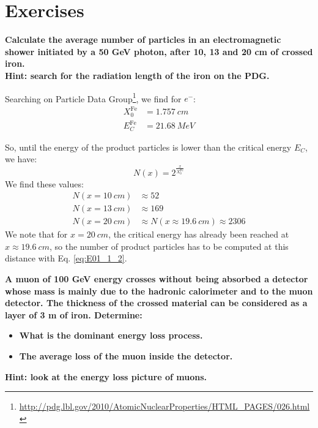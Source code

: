 \documentclass[../../main/main.tex]{subfiles}
\begin{document}
\chapter{Exercises}

\begin{exercise}{}{}
	\textbf{Calculate the average number of particles in an electromagnetic shower initiated by a 50 GeV photon, after 10, 13 and 20 cm of crossed iron.\\Hint: search for the radiation length of the iron on the PDG.}

	\medskip
	Searching on Particle Data Group\footnote{\url{http://pdg.lbl.gov/2010/AtomicNuclearProperties/HTML_PAGES/026.html}}, we find for \( e^- \):
	\begin{align}
		X_0^{\text{Fe}}	&=	1.757 \ \si{cm}	\\
		E_C^{\text{Fe}}	&=	21.68 \ \si{MeV}
		\label{eq:E01_1_1}
	\end{align}

	So, until the energy of the product particles is lower than the critical energy \( E_C \), we have:
	\begin{equation}
		N(x) = 2^{\frac{x}{X_0^{\text{Fe}}}}
		\label{eq:E01_1_2}
	\end{equation}
	We find these values:
	\begin{align}
		N(x = 10 \ \si{cm}) &\approx 52		\\
		N(x = 13 \ \si{cm}) &\approx 169	\\
		N(x = 20 \ \si{cm}) &\approx N(x \approx 19.6 \ \si{cm}) \approx 2306
	\end{align}
	We note that for \( x = 20 \ \si{cm} \), the critical energy has already been reached at \( x \approx 19.6 \ \si{cm} \), so the number of product particles has to be computed at this distance with Eq. \ref{eq:E01_1_2}.
\end{exercise}





\bigskip
\begin{exercise}{}{}
	\textbf{A muon of 100 GeV energy crosses without being absorbed a detector whose mass is mainly due to the hadronic calorimeter and to the muon detector. The thickness of the crossed material can be considered as a layer of 3 m of iron. Determine:}
	\begin{itemize}
		\item \textbf{What is the dominant energy loss process.}
		\item \textbf{The average loss of the muon inside the detector.}
	\end{itemize}
	\textbf{Hint: look at the energy loss picture of muons.}
\end{exercise}
\end{document}
